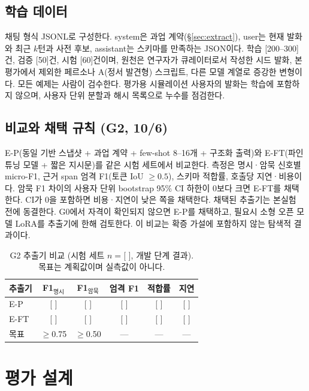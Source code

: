\documentclass[10pt,twocolumn,letterpaper]{article}
\newcommand{\fillin}[1]{\textcolor{fillc}{[#1]}}
\begin{document}
\subsection{학습 데이터}
채팅 형식 JSONL로 구성한다. system은 과업 계약(§\ref{sec:extract}), user는 현재 발화와 최근 $k$턴과 사전 후보, assistant는 스키마를 만족하는 JSON이다. 학습 \fillin{200–300}건, 검증 \fillin{50}건, 시험 \fillin{60}건이며, 원천은 연구자가 큐레이터로서 작성한 시드 발화, 본 평가에서 제외한 페르소나 A(정서 발견형) 스크립트, 다른 모델 계열로 증강한 변형이다. 모든 예제는 사람이 검수한다. 평가용 시뮬레이션 사용자의 발화는 학습에 포함하지 않으며, 사용자 단위 분할과 해시 목록으로 누수를 점검한다.

\subsection{비교와 채택 규칙 (G2, 10/6)}
E-P(동일 기반 스냅샷 + 과업 계약 + few-shot 8–16개 + 구조화 출력)와 E-FT(파인튜닝 모델 + 짧은 지시문)를 같은 시험 세트에서 비교한다. 측정은 명시·암묵 신호별 micro-F1, 근거 span 엄격 F1(토큰 IoU $\ge0.5$), 스키마 적합률, 호출당 지연·비용이다. 암묵 F1 차이의 사용자 단위 bootstrap 95\% CI 하한이 0보다 크면 E-FT를 채택한다. CI가 0을 포함하면 비용·지연이 낮은 쪽을 채택한다. 채택된 추출기는 본실험 전에 동결한다. G0에서 자격이 확인되지 않으면 E-P를 채택하고, 필요시 소형 오픈 모델 LoRA를 추출기에 한해 검토한다. 이 비교는 확증 가설에 포함하지 않는 탐색적 결과이다.

\begin{table}[t]
\centering\small
\setlength{\tabcolsep}{4pt}
\begin{tabular}{@{}lccccc@{}}
\toprule
추출기 & F1$_{\text{명시}}$ & F1$_{\text{암묵}}$ & 엄격 F1 & 적합률 & 지연 \\
\midrule
E-P & \fillin{ } & \fillin{ } & \fillin{ } & \fillin{ } & \fillin{ } \\
E-FT & \fillin{ } & \fillin{ } & \fillin{ } & \fillin{ } & \fillin{ } \\
\midrule
목표 & $\ge$0.75 & $\ge$0.50 & — & — & — \\
\bottomrule
\end{tabular}
\caption{G2 추출기 비교 (시험 세트 $n=$\fillin{ }, 개발 단계 결과). 목표는 계획값이며 실측값이 아니다.}
\label{tab:ft}
\end{table}

\section{평가 설계}
\label{sec:eval}
\end{document}
